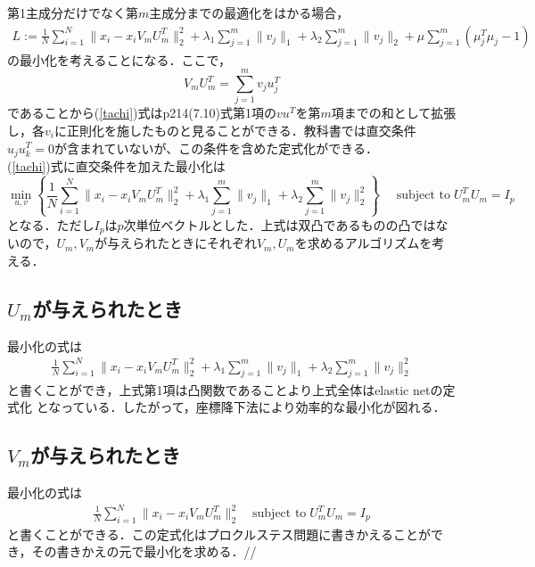\documentclass{jsarticle}
\theoremstyle{definition}
\theoremstyle{mystyle} %
\begin{document}
\large   第1主成分だけでなく第$m$主成分までの最適化をはかる場合，
\begin{align}
\label{tachi}
    L:=\frac{1}{N}\sum_{i=1}^N\|x_i -x_iV_mU_m^T\|_2^2 +\lambda_1\sum_{j=1}^m\|v_j\|_1
            +\lambda_2\sum_{j=1}^m\|v_j\|_2 + \mu\sum_{j=1}^m (\mu_j^T\mu_j -1)
\end{align}
の最小化を考えることになる．ここで，
$$V_m U_m^T = \sum_{j=1}^m v_ju_j^T$$
であることから(\ref{tachi})式はp214(7.10)式第1項の$vu^T$を第$m$項までの和として拡張し，各$v_i$に正則化を施したものと見ることができる．教科書では直交条件$u_ju_k^T=0$が含まれていないが、この条件を含めた定式化ができる．\\

(\ref{tachi})式に直交条件を加えた最小化は
\begin{equation}
    \min_{u,v}\left\{\frac{1}{N}\sum_{i=1}^N\|x_i - x_i V_m U_m^T \|_2^2+\lambda_{1}\sum_{j=1}^m\|v_j\|_1 +\lambda_{2}\sum_{j=1}^m\|v_j\|_2^2\right\}\quad \text{ subject to}\; U_m^T U_m = I_p
\end{equation}
となる．ただし$I_p$は$p$次単位ベクトルとした．上式は双凸であるものの凸ではないので，$U_m,V_m$が与えられたときにそれぞれ$V_m,U_m$を求めるアルゴリズムを考える．\\

\subsection*{$U_m$が与えられたとき}
最小化の式は
\begin{align*}
    \frac{1}{N}\sum_{i=1}^N \|x_i - x_i V_m U_m^T\|_2^2+\lambda_{1}\sum_{j=1}^m\|v_j\|_1 +\lambda_{2}\sum_{j=1}^m\|v_j\|_2^2
\end{align*}
と書くことができ，上式第1項は凸関数であることより上式全体はelastic netの定式化
となっている．したがって，座標降下法により効率的な最小化が図れる．\\

\subsection*{$V_m$が与えられたとき}
最小化の式は
\begin{align}
\label{pro}
    \frac{1}{N}\sum_{i=1}^N \|x_i - x_i V_m U_m^T\|_2^2\quad \text{subject to}\;U_m^T U_m = I_p
\end{align}
と書くことができる．この定式化はプロクルステス問題に書きかえることができ，その書きかえの元で最小化を求める．//
\end{document}
